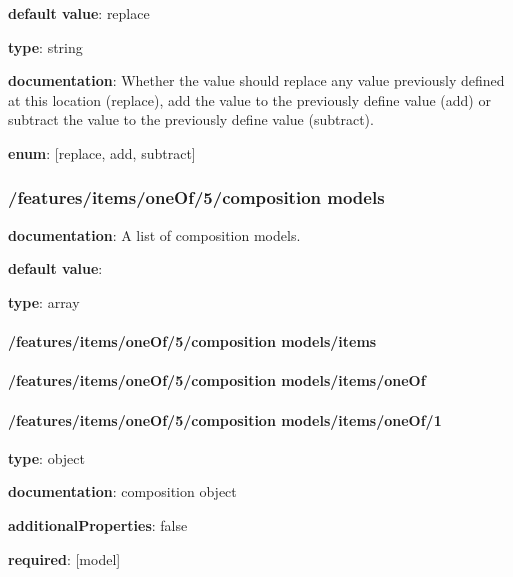 \begin{itemized}
\item {\bf default value}: replace
\item {\bf type}: string
\item {\bf documentation}: Whether the value should replace any value previously defined at this location (replace), add the value to the previously define value (add) or subtract the value to the previously define value (subtract).
\item {\bf enum}: [replace, add, subtract]\end{itemized}\subsubsection{/features/items/oneOf/5/composition models} \begin{itemized}
\item {\bf documentation}: A list of composition models.
\item {\bf default value}: 
\item {\bf type}: array
\paragraph{/features/items/oneOf/5/composition models/items} \begin{itemized}
\end{itemized}\end{itemized}\paragraph{/features/items/oneOf/5/composition models/items/oneOf} \begin{itemized}
\end{itemized}\paragraph{/features/items/oneOf/5/composition models/items/oneOf/1} \begin{itemized}
\item {\bf type}: object
\item {\bf documentation}: composition object
\item {\bf additionalProperties}: false
\item {\bf required}: [model]\end{itemized}
